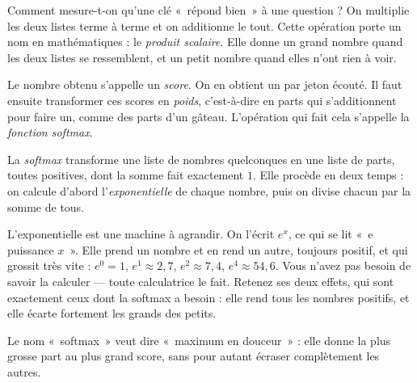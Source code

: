 Comment mesure-t-on qu'une clé «~répond bien~» à une question ? On multiplie
les deux listes terme à terme et on additionne le tout. Cette opération porte
un nom en mathématiques : le \emph{produit scalaire}. Elle donne un grand
nombre quand les deux listes se ressemblent, et un petit nombre quand elles
n'ont rien à voir.

Le nombre obtenu s'appelle un \emph{score}. On en obtient un par jeton
écouté. Il faut ensuite transformer ces scores en \emph{poids},
c'est-à-dire en parts qui s'additionnent pour faire un, comme des parts d'un
gâteau. L'opération qui fait cela s'appelle la \emph{fonction softmax}.

\begin{definition}
La \emph{softmax} transforme une liste de nombres quelconques en une liste de
parts, toutes positives, dont la somme fait exactement $1$. Elle procède en
deux temps : on calcule d'abord l'\emph{exponentielle} de chaque nombre, puis
on divise chacun par la somme de tous.

L'exponentielle est une machine à agrandir. On l'écrit $e^{x}$, ce qui se lit
«~e puissance $x$~». Elle prend un nombre et en rend un autre, toujours
positif, et qui grossit très vite : $e^{0} = 1$, $e^{1} \approx 2{,}7$,
$e^{2} \approx 7{,}4$, $e^{4} \approx 54{,}6$. Vous n'avez pas besoin de
savoir la calculer — toute calculatrice le fait. Retenez ses deux effets, qui
sont exactement ceux dont la softmax a besoin : elle rend tous les nombres
positifs, et elle écarte fortement les grands des petits.

Le nom «~softmax~» veut dire «~maximum en douceur~» : elle donne la plus
grosse part au plus grand score, sans pour autant écraser complètement les
autres.
\end{definition}

